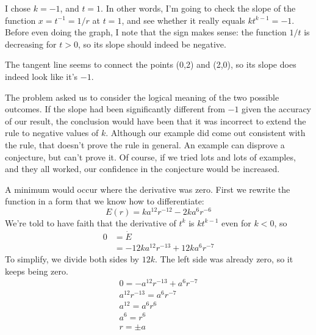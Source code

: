
I chose $k=-1$, and $t=1$. In other words, I'm going to check the slope of the function $x=t^{-1}=1/r$ at $t=1$, and
see whether it really equals $kt^{k-1}=-1$. Before even doing the graph, I note that the sign makes sense: the function
$1/t$ is decreasing for $t>0$, so its slope should indeed be negative.


The tangent line seems to connect the points (0,2) and (2,0), so its slope does indeed look like it's $-1$.

The problem asked us to consider the logical meaning of the two possible outcomes. If the slope had been significantly
different from $-1$ given the accuracy of our result, the conclusion would have been that it was incorrect to extend the
rule to negative values of $k$. Although our example did come out consistent with the rule, that doesn't prove the rule
in general. An example can disprove a conjecture, but can't prove it. Of course, if we tried lots and lots of examples,
and they all worked, our confidence in the conjecture would be increased.


A minimum would occur where the derivative was zero. First we rewrite the function in a form that we
know how to differentiate:
\begin{equation*}
  E(r) = ka^{12}r^{-12}-2ka^6r^{-6}
\end{equation*}
We're told to have faith that the derivative of $t^k$ is $kt^{k-1}$ even for $k<0$, so
\begin{align*}
  0 &= \dot{E} \\
    &= -12ka^{12}r^{-13}+12ka^6r^{-7} 
\end{align*}
To simplify, we divide both sides by $12k$. The left side was already zero, so it keeps being zero.
\begin{gather*}
  0  = -a^{12}r^{-13}+a^6r^{-7} \\
  a^{12}r^{-13} = a^6r^{-7} \\
  a^{12} = a^6r^6 \\
  a^6 = r^6 \\
  r = \pm a
\end{gather*}

